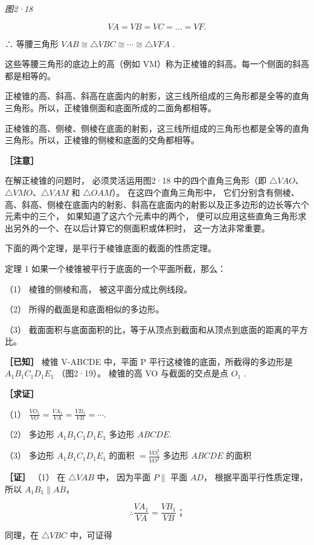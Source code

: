\emph{图2·18}

\[
V A = V B = V C = \dots = V F.
\]

∴ 等腰三角形
\(VAB \cong \triangle VBC \cong \cdots \cong \triangle VFA\) .

这些等腰三角形的底边上的高（例如
VM）称为正棱锥的斜高。每一个侧面的斜高都是相等的。

正棱锥的高、斜高、斜高在底面内的射影，这三线所组成的三角形都是全等的直角三角形。所以，正棱锥侧面和底面所成的二面角都相等。

正棱锥的高、侧棱、侧棱在底面的射影，这三线所组成的三角形也都是全等的直角三角形。所以，正棱锥的侧棱和底面的交角都相等。

\textbf{［注意］}

在解正棱锥的问题时， 必须灵活运用图2·18 中的四个直角三角形（即
\(\triangle VAO\)、\(\triangle VMO\)、\(\triangle VAM\) 和
\(\triangle OAM\)）。 在这四个直角三角形中，
它们分别含有侧棱、高、斜高、侧棱在底面内的射影、斜高在底面内的射影以及正多边形的边长等六个元素中的三个，
如果知道了这六个元素中的两个，
便可以应用这些直角三角形求出另外的一个、在以后计算它的侧面积或体积时，
这一方法非常重要。

下面的两个定理，是平行于棱锥底面的截面的性质定理。

定理 1 如果一个棱锥被平行于底面的一个平面所截，那么：

（1） 棱锥的侧棱和高， 被这平面分成比例线段。

（2） 所得的截面是和底面相似的多边形。

（3）
截面面积与底面面积的比，等于从顶点到截面和从顶点到底面的距离的平方比。

\textbf{［已知］} 棱锥 V-ABCDE 中，平面 P
平行这棱锥的底面，所截得的多边形是 \(A_{1}B_{1}C_{1}D_{1}E_{1}\)
（图2·19）。 棱锥的高 VO 与截面的交点是点 \(O_{1}\) .

\textbf{［求证］}

（1） \(\frac{VO_1}{VO} = \frac{VA_1}{VA} = \frac{VB_1}{VB} = \cdots.\)

（2） 多边形 \(A_{1}B_{1}C_{1}D_{1}E_{1}\) 多边形 \(ABCDE\).

（3） 多边形 \(A_{1}B_{1}C_{1}D_{1}E_{1}\) 的面积
\(= \frac{VO_{1}^{2}}{VO^{2}}\) 多边形 \(ABCDE\) 的面积

\textbf{［证］} （1） 在 \(\triangle VAB\) 中， 因为平面 \(P \parallel\)
平面 \(AD\)， 根据平面平行性质定理， 所以 \(A_{1}B_{1} \parallel AB\)，

\[
\therefore \frac {V A _ {1}}{V A} = \frac {V B _ {1}}{V B}\text{；}
\]

同理，在 \(\triangle VBC\) 中，可证得

